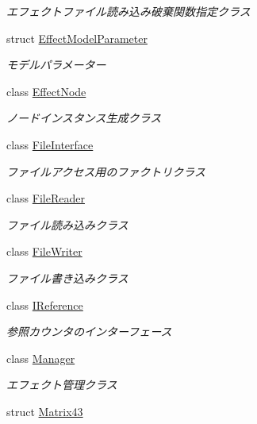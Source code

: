 \begin{DoxyCompactItemize}
\begin{DoxyCompactList}\small\item\em エフェクトファイル読み込み破棄関数指定クラス \end{DoxyCompactList}\item 
struct \mbox{\hyperlink{struct_effekseer_1_1_effect_model_parameter}{Effect\+Model\+Parameter}}
\begin{DoxyCompactList}\small\item\em モデルパラメーター \end{DoxyCompactList}\item 
class \mbox{\hyperlink{class_effekseer_1_1_effect_node}{Effect\+Node}}
\begin{DoxyCompactList}\small\item\em ノードインスタンス生成クラス \end{DoxyCompactList}\item 
class \mbox{\hyperlink{class_effekseer_1_1_file_interface}{File\+Interface}}
\begin{DoxyCompactList}\small\item\em ファイルアクセス用のファクトリクラス \end{DoxyCompactList}\item 
class \mbox{\hyperlink{class_effekseer_1_1_file_reader}{File\+Reader}}
\begin{DoxyCompactList}\small\item\em ファイル読み込みクラス \end{DoxyCompactList}\item 
class \mbox{\hyperlink{class_effekseer_1_1_file_writer}{File\+Writer}}
\begin{DoxyCompactList}\small\item\em ファイル書き込みクラス \end{DoxyCompactList}\item 
class \mbox{\hyperlink{class_effekseer_1_1_i_reference}{I\+Reference}}
\begin{DoxyCompactList}\small\item\em 参照カウンタのインターフェース \end{DoxyCompactList}\item 
class \mbox{\hyperlink{class_effekseer_1_1_manager}{Manager}}
\begin{DoxyCompactList}\small\item\em エフェクト管理クラス \end{DoxyCompactList}\item 
struct \mbox{\hyperlink{struct_effekseer_1_1_matrix43}{Matrix43}}

\end{DoxyCompactItemize}
